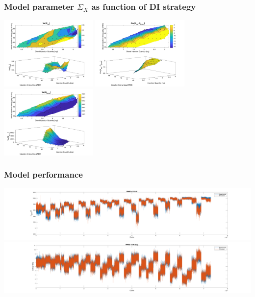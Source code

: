 \documentclass[aspectratio=169, 10pt]{beamer}
\begin{document}
\begin{frame}
\frametitle{Model parameter $\Sigma_X$ as function of DI strategy}
\begin{center}
\includegraphics[width=0.36\textwidth]{../Dual_Fuel_Plots/Sigma_X_11.png}
\includegraphics[width=0.36\textwidth]{../Dual_Fuel_Plots/Sigma_X_12.png}
\includegraphics[width=0.36\textwidth]{../Dual_Fuel_Plots/Sigma_X_22.png}
\end{center}
\end{frame}


\begin{frame}
\frametitle{Model performance}
\begin{center}
\vspace{-1em}
\includegraphics[trim=150 0 150 0, clip, width=\textwidth]{../Dual_Fuel_Plots/Q_gross_comparison.png}
\includegraphics[trim=150 0 150 0, clip, width=\textwidth]{../Dual_Fuel_Plots/CA50_comparison.png}
\end{center}
\end{frame}
\end{document}
